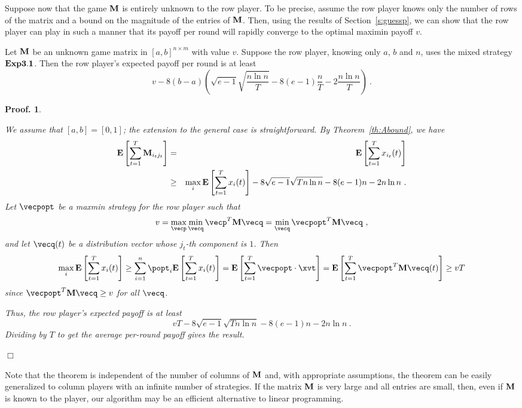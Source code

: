 \documentclass[12pt]{article}
\newcommand{\E}{\mbox{\rm\bf E}}
\newcommand{\Abound}{{\bf Exp3.1}}
\newcommand{\brackets}[1]{\left[{#1}\right]}
\newcommand{\x}[2]{x_{#1}({#2})}
\renewcommand{\i}[1]{i_{#1}}
\newcommand{\xit}{\x{\i{t}}{t}}
\newcommand{\mat}{{\bf M}}
\newtheorem{pproof}{Proof.}
\newenvironment{proof}{
\begin{pproof}
        \begin{rm}\begin{rm}}{
        \hspace*{\fill} $\Box$
        \end{rm}\end{rm}
        \end{pproof}
}
\begin{document}
Suppose now that the game $\mat$ is entirely unknown to the row player.
To be precise, assume the row player knows only the number of
rows of the matrix and a bound on the magnitude of the entries
of $\mat$.
Then, using the results of Section~\ref{s:guessp}, we can show that the row
player can play in such a manner that its payoff per round will rapidly
converge to the optimal maximin payoff $v$.
%
\begin{theorem}
Let $\mat$ be an unknown game matrix in $[a,b]^{n\times m}$ with value $v$.
Suppose the row player, knowing only $a$, $b$ and $n$, uses the mixed strategy
$\Abound$.  Then the row player's expected payoff per round is at least
\[
        v  - 8(b-a)\left(
	\sqrt{e-1}\sqrt{\frac{n \ln n}{T}} - 8(e-1)\frac{n}{T} -2\frac{n\ln n}{T}\right)~.
\]
\end{theorem}
%
\begin{proof}
We assume that $[a,b]=[0,1]$; the extension to the general case is
straightforward. By Theorem~\ref{th:Abound}, we have
\begin{eqnarray*}
    \E\left[\sum_{t=1}^T \mat_{i_t j_t}\right]
&=&
    \E\left[\sum_{t=1}^T \xit\right] 
\\ & \geq &
        \max_{i} \E\left[\sum_{t=1}^T \x{i}{t}\right] 
        - 8\sqrt{e-1}\sqrt{T n \ln n} - 8(e-1)n -2n\ln n~.
\end{eqnarray*}
Let $\vecpopt$ be a maxmin strategy for the row player such that
\[
v = \max_{\vecp} \min_{\vecq} \vecp^T \mat \vecq
  = \min_{\vecq} \vecpopt^T \mat \vecq~,
\]
and let $\vecq(t)$ be a distribution vector whose $j_t$-th component is
$1$.
Then
\[
    \max_{i} \E\brackets{\sum_{t=1}^T \x{i}{t}}
\geq
        \sum_{i=1}^n \popt_i \E\brackets{\sum_{t=1}^T \x{i}{t}}
=
        \E\brackets{\sum_{t=1}^T \vecpopt\cdot\xvt}
=
    \E\brackets{\sum_{t=1}^T \vecpopt^T \mat \vecq(t)}
\geq
    v T
\]
since $\vecpopt^T \mat \vecq \geq v$ for all $\vecq$.

Thus, the row player's expected payoff is at least
\[
        v T - 8\sqrt{e-1}\sqrt{T n \ln n} - 8(e-1)n -2n\ln n~.
\]
Dividing by $T$ to get the average per-round payoff gives the result.
\end{proof}
%
Note that the theorem is independent of the number of columns of $\mat$
and, with appropriate assumptions, the theorem can be easily
generalized to column players with an infinite number of strategies.
If the matrix $\mat$ is very large and all entries are small,
then, even if $\mat$ is known to the player, our algorithm may be an
efficient alternative to linear programming.
\end{document}
